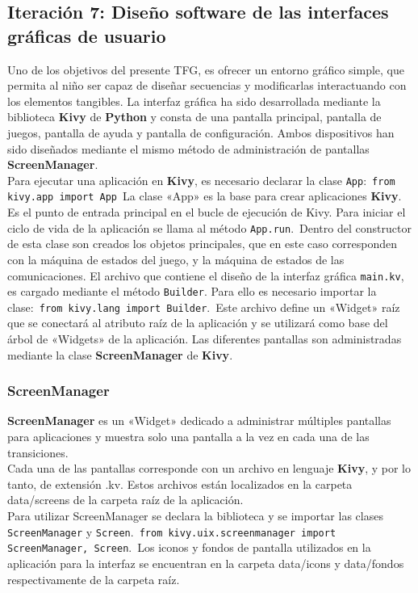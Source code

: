 \subsection{Iteración 7: Diseño software de las interfaces gráficas de usuario}
Uno de los objetivos del presente TFG, es ofrecer un entorno gráfico simple, que permita al niño ser capaz de diseñar secuencias y modificarlas interactuando con los elementos tangibles.
La interfaz gráfica ha sido desarrollada mediante la biblioteca \textbf{Kivy} de \textbf{Python} y consta de una pantalla principal, pantalla de juegos, pantalla de ayuda y pantalla de configuración. Ambos dispositivos han sido diseñados mediante el mismo método de administración de pantallas \textbf{ScreenManager}.\\
Para ejecutar una aplicación en \textbf{Kivy}, es necesario declarar la clase \texttt{App}:\
\texttt{from kivy.app import App}\
La clase «App» es la base para crear aplicaciones \textbf{Kivy}. Es el punto de entrada principal en el bucle de ejecución de Kivy. Para iniciar el ciclo de vida de la aplicación se llama al método \texttt{App.run}.\
Dentro del constructor de esta clase son creados los objetos principales, que en este caso corresponden con la máquina de estados del juego, y la máquina de estados de las comunicaciones.
El archivo que contiene el diseño de la interfaz gráfica \texttt{main.kv}, es cargado mediante el método \texttt{Builder}.
Para ello es necesario importar la clase:\
\texttt{from kivy.lang import Builder}.\
Este archivo define un «Widget» raíz que se conectará al atributo raíz de la aplicación y se utilizará como base del árbol de «Widgets» de la aplicación.
Las diferentes pantallas son administradas mediante la clase \textbf{ScreenManager} de \textbf{Kivy}.
\subsubsection{ScreenManager}
\textbf{ScreenManager} es un «Widget» dedicado a administrar múltiples pantallas para aplicaciones y muestra solo una pantalla a la vez en cada una de las transiciones.\\
Cada una de las pantallas corresponde con un archivo en lenguaje \textbf{Kivy}, y por lo tanto, de extensión .kv. Estos archivos están localizados en la carpeta data/screens de la carpeta raíz de la aplicación.\\
Para utilizar ScreenManager se declara la biblioteca y se importar las clases \texttt{ScreenManager} y \texttt{Screen}.\
\texttt{from kivy.uix.screenmanager import ScreenManager, Screen}.\
Los iconos y fondos de pantalla utilizados en la aplicación para la interfaz se encuentran en la carpeta data/icons y data/fondos respectivamente de la carpeta raíz.\\
